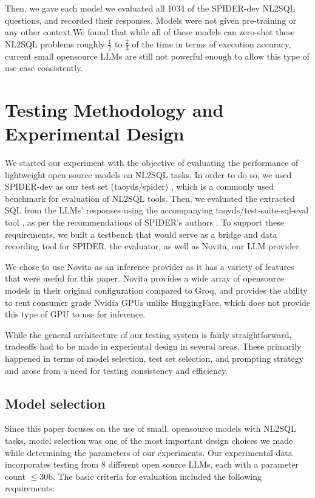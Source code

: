 \documentclass[sigconf]{acmart}
\begin{document}
Then, we gave each model we evaluated all 1034 of the SPIDER-dev NL2SQL questions, and recorded their responses. Models
were not given pre-training or any other context.We found that while all of these models can zero-shot these NL2SQL problems
roughly $\frac{1}{2}$ to $\frac{2}{3}$ of the time 
in terms of execution accuracy, current small opensource LLMs are still not powerful enough to allow this type of use case 
consistently.

\section{Testing Methodology and Experimental Design}

We started our experiment with the objective of evaluating the performance
of lightweight open source models on NL2SQL tasks. In order to do so, we used SPIDER-dev as our test set (taoyds/spider)
\cite{Yu&al.18c}, which is a commonly used benchmark for evaluation of NL2SQL tools. Then, we evaluated the extracted SQL 
from the LLMs' responses using the accompanying taoyds/test-suite-sql-eval tool \cite{ruiqi20}, as per the recommendations 
of SPIDER's authors \cite{Yu&al.18c}. To support these requirements, we built a testbench\cite{sourceCode} that would 
serve as a bridge and data recording tool for SPIDER, the evaluator, as well as Novita, our LLM provider. 

We chose to use
Novita as an inference provider as it has a variety of features that were useful for this paper. Novita provides a wide
array of opensource models in their original configuration compared to Groq, and provides the ability to rent consumer
grade Nvidia GPUs unlike HuggingFace, which does not provide this type of GPU to use for inference.

While the general architecture of our testing system is fairly straightforward, tradeoffs had to be made in experiental
design in several areas. These primarily happened in terms of model selection, test set selection, and prompting
strategy and arose from a need for testing consistency and efficiency. 

\subsection*{Model selection}

Since this paper focuses on the use of small, opensource models with NL2SQL tasks, model selection was one of the most
important design choices we made while determining the parameters of our experiments.
Our experimental data incorporates testing from 8 different open source LLMs, each with a parameter count $\leq 30$b. 
The basic criteria for evaluation included the following requirements:
\end{document}

